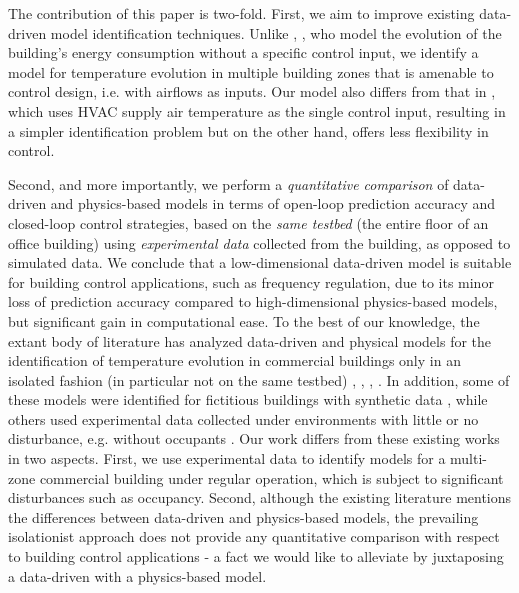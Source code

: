 The contribution of this paper is two-fold. First, we aim to improve existing
data-driven model identification techniques. Unlike \cite{Radecki:2012aa}, \cite{Radecki:2013ab}, who model the evolution of the building's energy consumption without a specific control input, we identify a model for temperature evolution in multiple building zones that is amenable to control design, i.e. with airflows as inputs. Our model also differs from that in \cite{Aswani:2012aa}, which uses HVAC supply air temperature as the single control input, resulting in a simpler identification problem but on the other hand, offers less flexibility in control.

Second, and more importantly, we perform a \textit{quantitative comparison} of data-driven and physics-based models in terms of open-loop prediction accuracy and closed-loop control strategies, based on the \textit{same testbed} (the entire floor of an office building) using \textit{experimental data} collected from the building, as opposed to simulated data. %
We conclude that a low-dimensional data-driven model is suitable for building control applications, such as frequency regulation, due to its minor loss of prediction accuracy compared to high-dimensional physics-based models, but significant gain in computational ease. 
To the best of our knowledge, the extant body of literature has analyzed data-driven and physical models for the identification of temperature evolution in commercial buildings only in an isolated fashion (in particular not on the same testbed) \cite{Ma:2011aa}, \cite{Siroky:2011aa}, \cite{Lin:2015aa}, \cite{Qie}. In addition, some of these models were identified for fictitious buildings with synthetic data \cite{Cole:2013aa, Goyal:2013aa, David}, while others used experimental data collected under environments with little or no disturbance, e.g. without occupants \cite{Lin:2015aa}. Our work differs from these existing works in two aspects. First, we use experimental data to identify models for a multi-zone commercial building under regular operation, which is subject to significant disturbances such as occupancy. Second, although the existing literature mentions the differences between data-driven and physics-based models, the prevailing isolationist approach does not provide any quantitative comparison with respect to building control applications - a fact we would like to alleviate by juxtaposing a data-driven with a physics-based model.


